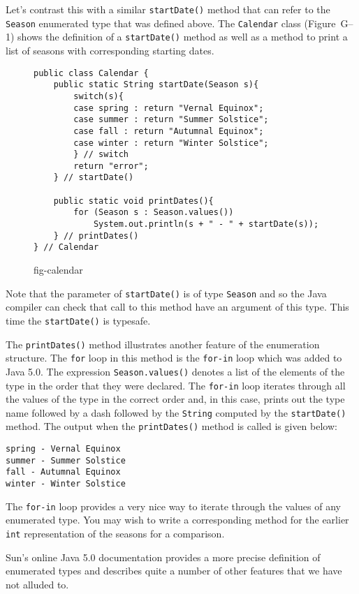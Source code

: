 Let's contrast this with a similar {\tt startDate()} method that
can refer to the {\tt Season} enumerated type that was defined above. 
The {\tt Calendar} class (Figure~G--1) shows the definition of 
a {\tt startDate()} method as well as a method to print a list of 
seasons with corresponding starting dates.
\begin{figure}[h!]
\jjjprogstart
\begin{jjjlisting}
\begin{lstlisting}
public class Calendar {
    public static String startDate(Season s){
        switch(s){
        case spring : return "Vernal Equinox";
        case summer : return "Summer Solstice";
        case fall : return "Autumnal Equinox";
        case winter : return "Winter Solstice";
        } // switch
        return "error";
    } // startDate()
 
    public static void printDates(){
        for (Season s : Season.values())
            System.out.println(s + " - " + startDate(s));
    } // printDates()
} // Calendar
\end{lstlisting}
\end{jjjlisting}
{fig-calendar}
\end{figure}
Note that the parameter of {\tt startDate()} is of type {\tt Season}
and so the Java compiler can check that call to this method have
an argument of this type.  This time the {\tt startDate()} is typesafe.

The {\tt printDates()} method illustrates another feature of the 
enumeration structure.  The {\tt for} loop in this method is the 
{\tt for-in} loop which was added to Java 5.0.  The expression
{\tt Season.values()} denotes a list of the elements of the
type in the order that they were declared.  The {\tt for-in} loop
iterates through all the values of the type in the correct order and,
in this case, prints out the type name followed by a dash followed
by the {\tt String} computed by the {\tt startDate()} method. 
The output when the {\tt printDates()} method is called is given below: 

\begin{jjjlisting}
\begin{lstlisting}
spring - Vernal Equinox
summer - Summer Solstice
fall - Autumnal Equinox
winter - Winter Solstice
\end{lstlisting}
\end{jjjlisting}

The {\tt for-in} loop provides a very nice way to iterate through the
values of any enumerated type. You may wish to write a corresponding 
method for the  earlier {\tt int} representation of the seasons for a
comparison.

Sun's online Java 5.0 documentation provides a more precise definition of 
enumerated types and describes quite a number of other features that we
have not alluded to.


